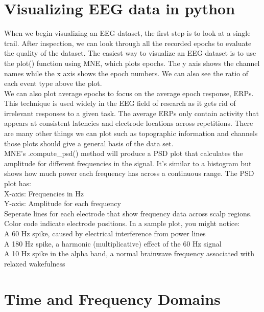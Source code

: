 \documentclass{article}
\begin{document}
\section{Visualizing EEG data in python}
When we begin visualizing an EEG dataset, the first step is to look at a single trail. After inspection, we can look through all the recorded epochs to evaluate the quality of the dataset. The easiest way to visualize an EEG dataset is to use the plot() function using MNE, which plots epochs. The y axis shows the channel names while the x axis shows the epoch numbers. We can also see the ratio of each event type above the plot. \\
We can also plot average epochs to focus on the average epoch response, ERPs. This technique is used widely in the EEG field of research as it gets rid of irrelevant responses to a given task. The average ERPs only contain activity that appears at consistent latencies and electrode locations across repetitions. There are many other things we can plot such as topographic information and channels those plots should give a general basis of the data set. \\
MNE's .compute\_psd() method will produce a PSD plot that calculates the amplitude for different frequencies in the signal. It's similar to a histogram but shows how much power each frequency has across a continuous range. The PSD plot has: \\
X-axis: Frequencies in Hz \\
Y-axis: Amplitude for each frequency \\
Seperate lines for each electrode that show frequency data across scalp regions. Color code indicate electrode positions. In a sample plot, you might notice:\\
A 60 Hz spike, caused by electrical interference from power lines\\
A 180 Hz spike, a harmonic (multiplicative) effect of the 60 Hz signal\\
A 10 Hz spike in the alpha band, a normal brainwave frequency associated with relaxed wakefulness

\section{Time and Frequency Domains}
\end{document}
